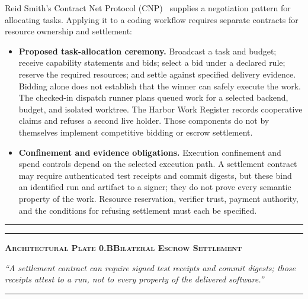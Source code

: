 Reid Smith's Contract Net Protocol (CNP)~ supplies a
negotiation pattern for allocating tasks. Applying it to a coding workflow
requires separate contracts for resource ownership and settlement:
\begin{itemize}[leftmargin=1.8em,itemsep=2pt]
  \item \textbf{Proposed task-allocation ceremony.} Broadcast a task and budget;
  receive capability statements and bids; select a bid under a declared rule;
  reserve the required resources; and settle against specified delivery evidence.
  Bidding alone does not establish that the winner can safely execute the work.
  The checked-in dispatch runner plans queued work for a selected backend,
  budget, and isolated worktree. The Harbor Work Register records cooperative
  claims and refuses a second live holder. Those components do not by themselves
  implement competitive bidding or escrow settlement.
  \item \textbf{Confinement and evidence obligations.} Execution confinement and
  spend controls depend on the selected execution path. A settlement contract
  may require authenticated test receipts and commit digests, but these bind
  an identified run and artifact to a signer; they do not prove every semantic
  property of the work. Resource reservation, verifier trust, payment authority,
  and the conditions for refusing settlement must each be specified.
\end{itemize}

\vspace{10pt}
\noindent\begin{minipage}{\linewidth}
  \centering
  \par\vspace{8pt}%
  {\color{pdcobalt}\rule{\linewidth}{1.2pt}}\par\vspace{5pt}%
  \raggedright
  {\color{pdswissred}\rule{4.5pt}{4.5pt}}\enspace%
  {\pdgrotesk\bfseries\scshape\fontsize{9}{11}\selectfont\color{hhink}%
    Architectural Plate 0.B\enspace\textperiodcentered\enspace Bilateral Escrow Settlement}\par\vspace{4pt}%
  {\pdgrotesk\itshape\fontsize{9.5}{13}\selectfont\color{hhink}%
    ``A settlement contract can require signed test receipts and commit digests; those receipts attest to a run, not to every property of the delivered software.''}\par\vspace{6pt}%
  {\color{hhgray!30}\rule{\linewidth}{0.4pt}}
\end{minipage}
\vspace{10pt}

